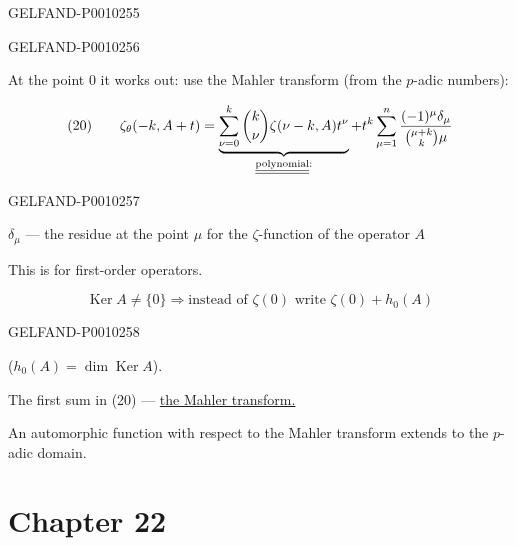 \begin{GelfandAdjacentEvidence}{GELFAND-P001025}{5}

\end{GelfandAdjacentEvidence}
\begin{GelfandAdjacentEvidence}{GELFAND-P001025}{6}


At the point $0$ it works out: use the Mahler transform (from the $p$-adic numbers):

\[
(20)\qquad
\zeta_\theta(-k,A+t)
=\underbrace{\sum_{\nu=0}^{k}\binom{k}{\nu}\zeta(\nu-k,A)t^\nu}
_{\text{\underline{\underline{polynomial}}:}}
+t^k\sum_{\mu=1}^{n}
\frac{(-1)^\mu\delta_\mu}{\binom{\mu+k}{k}\mu}
\]
\end{GelfandAdjacentEvidence}
\begin{GelfandAdjacentEvidence}{GELFAND-P001025}{7}


$\delta_\mu$ --- the residue at the point $\mu$ for the $\zeta$-function of the operator $A$

This is for first-order operators.

\[
\operatorname{Ker}A\ne\{0\}\Rightarrow
\text{instead of }\zeta(0)\text{ write }\zeta(0)+h_0(A)
\]
\end{GelfandAdjacentEvidence}
\begin{GelfandAdjacentEvidence}{GELFAND-P001025}{8}

($h_0(A)=\dim\operatorname{Ker}A$).

\end{GelfandAdjacentEvidence}

The first sum in (20) --- \underline{the Mahler transform.}

An automorphic function with respect to the Mahler transform extends to the $p$-adic domain.


\clearpage
{}
\section*{Chapter 22}
